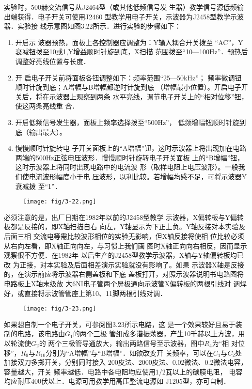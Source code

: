 实验时，500赫交流信号从J2464型（或其他低频信号发
生器）教学信号源低频输出端获得．电子开关可使用J2460
型教学用电子开关，示波器为J2458型教学示波器．实验接
线示意图如图3.22所示．进行实验的步骤如下：
\begin{enumerate}
    \item 开启示
波器预热，面板上各控制器应调整为：Y输入耦合开关拨至
“AC”，Y衰减钮拨至10或1,Y增益顺时针旋到底，X扫描
范围拨至“10—100Hz”．预热后调整好亮线位置与长度．
\item 开
启电子开关前将面板各钮调整如下：频率范围“25—50kHz”；
频率微调钮顺时针旋到底；A增幅与B增幅都逆时针旋到底
（增幅最小位置）。开启电子开关后，将在示波器上观察到两条
水平亮线，调节电子开关上的“相对位移”钮，使这两条亮线重
合．
\item 开启低频信号发生器，面板上频率选择拨至“500Hz”，
低频增幅钮顺时针旋到底（输出最大）。
\item 慢慢顺时针旋转电
子开关面板上的“A增幅”钮，这时示波器上将出现加在电路
两端的500Hz正弦电压波形．慢慢顺时针旋转电子开关面板
上的“B增幅”钮，这时示波器上将同时出现电路中的电流波
形（取样电阻上电压波形）。一般我们使电流波形幅度小于电
压波形，以利比较。若增幅均感不足，可将示波器Y衰减拨
至“1”．
\end{enumerate}

\begin{figure}[htp]
    \centering
\texttt{[image: fig/3-22.png]}
    \caption{}
\end{figure}

必须注意的是，出厂日期在1982年以前的J2458型教学
示波器，X偏转板与Y偏转板都是反接的，即X轴扫描自右
向左，Y轴显示为下正上负。Y轴反接对本实验及后面三相
交流电等需比较波形相位的实验无影响，但X轴反接将使相
位比较必须从右向左看，即X轴正向向左，与习惯上我们画
图时X轴正向向右相反，因而显示观察很不方便．在1982年
以后生产的J2458型教学示波器，X轴与Y轴偏转板均已改
为正接，对本实验及后面相差演示实验就没有影响了。如果
示波器X轴是反接的，在演示前应将示波器右侧盖板和下底
盖板打开，对照示波器说明书电路图将电路板上X轴末级放
大6NI电子管两个屏极通向示波管X偏转板的两根引线对
调焊好，或直接将示波管管座上第10、11脚两根引线对调．

\begin{figure}[htp]
    \centering
\texttt{[image: fig/3-23.png]}
    \caption{}
\end{figure}

如果想自制一个电子开关，可参阅图3.23所示电路，这
是一个效果较好且易于装制的电路，该电路由$G_1$的两个三极
管组成多谐振荡器，产生10千赫以上方波，用以轮流使$G_2$的
两个三极管导通放大，输出两路信号至示波器，图中$R_4$为“相
对位移”，$R_9$与$R_{10}$分别为“A增幅”与“B增幅”．如欲改变开
关频率，可以在$C_1$与$C_2$处加接双刀多掷开关，分别同时接入
200皮法、2000皮法、0.02微法、0.2微法电容，容量越大，开关
频率越低．电路中各电阻均应使用1/2瓦以上的碳膜电阻，
电容均应耐压400伏以上．电源可用教学用高压整流电源如
J1205型，亦可自制．

